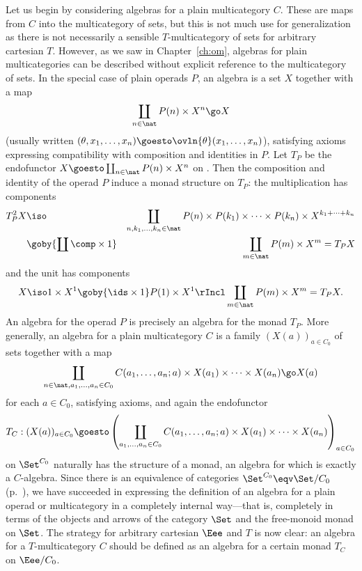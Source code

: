 Let us begin by considering algebras for a plain multicategory%
%
%
$C$.  These
are maps from $C$ into the multicategory of sets, but this is not much use
for generalization as there is not necessarily a sensible $T$-multicategory
of sets for arbitrary cartesian $T$.  However, as we saw in
Chapter~\ref{ch:om}, algebras for plain multicategories can be described
without explicit reference to the multicategory of sets.  In the special
case of plain operads $P$, an algebra is a set $X$ together with a map
\[
\coprod_{n\in\nat} P(n) \times X^n \go X
\]
%
(usually written $(\theta, x_1, \ldots, x_n) \goesto \ovln{\theta}(x_1,
\ldots, x_n)$), satisfying axioms expressing compatibility with composition
and identities in $P$.  Let $T_P$ be the endofunctor $X
\goesto \coprod_{n\in\nat} P(n) \times X^n$ on \Set.  Then the composition
and identity of the operad $P$ induce a monad structure on $T_P$:
the multiplication has components
%
\begin{eqnarray*}
T_P^2 X		&
\iso	&
\coprod_{n, k_1, \ldots, k_n \in \nat} P(n) \times P(k_1)
\times\cdots\times P(k_n) \times X^{k_1 + \cdots + k_n}	\\
	&
\goby{\coprod \comp \times 1}	&
\coprod_{m\in\nat} P(m) \times X^m
=
T_P X
\end{eqnarray*}
% 
and the unit has components
\[
X \iso
1 \times X^1
\goby{\ids \times 1}
P(1) \times X^1
\rIncl
\coprod_{m\in\nat} P(m) \times X^m
= 
T_P X.
\]
%
An algebra for the operad $P$ is precisely an algebra for the monad $T_P$.
More generally, an algebra for a plain multicategory $C$ is a family
$(X(a))_{a\in C_0}$ of sets together with a map
\[
\coprod_{n\in\nat, a_1, \ldots, a_n \in C_0} 
C(a_1, \ldots, a_n; a) \times X(a_1) \times \cdots \times X(a_n)
\go 
X(a)
\]
for each $a\in C_0$, satisfying axioms, and again the endofunctor
\[
\label{p:cl-endoftr}
T_C: 
(X(a))_{a\in C_0}
\goesto
\left(
\coprod_{a_1, \ldots, a_n \in C_0} 
C(a_1, \ldots, a_n; a) \times X(a_1) \times \cdots \times X(a_n)
\right)_{a\in C_0}
\]
on $\Set^{C_0}$ naturally has the structure of a monad, an algebra for
which is exactly a $C$-algebra.  Since there is an equivalence of
categories $\Set^{C_0} \eqv \Set/C_0$ (p.~\pageref{eq:Set-slice-power}), we
have succeeded in expressing the definition of an algebra for a plain
operad or multicategory in a completely internal way---that is, completely
in terms of the objects and arrows of the category $\Set$ and the
free-monoid monad on $\Set$.  The strategy for arbitrary cartesian $\Eee$
and $T$ is now clear: an algebra for a $T$-multicategory $C$ should be
defined as an algebra for a certain monad $T_C$ on $\Eee/C_0$.


